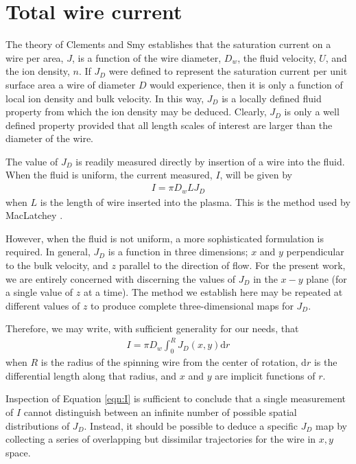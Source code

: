 \section{Total wire current}\label{sec:integral}

The theory of Clements and Smy establishes that the saturation current on a wire per area, $J$, is a function of the wire diameter, $D_w$, the fluid velocity, $U$, and the ion density, $n$.  If $J_D$ were defined to represent the saturation current per unit surface area a wire of diameter $D$ would experience, then it is only a function of local ion density and bulk velocity.  In this way, $J_D$ is a locally defined fluid property from which the ion density may be deduced.  Clearly, $J_D$ is only a well defined property provided that all length scales of interest are larger than the diameter of the wire.

The value of $J_D$ is readily measured directly by insertion of a wire into the fluid.  When the fluid is uniform, the current measured, $I$, will be given by
\begin{align}
I = \pi D_w L J_D\nonumber
\end{align}
when $L$ is the length of wire inserted into the plasma.  This is the method used by MacLatchey \cite{}.

However, when the fluid is not uniform, a more sophisticated formulation is required.  In general, $J_D$ is a function in three dimensions; $x$ and $y$ perpendicular to the bulk velocity, and $z$ parallel to the direction of flow.  For the present work, we are entirely concerned with discerning the values of $J_D$ in the $x-y$ plane (for a single value of $z$ at a time).  The method we establish here may be repeated at different values of $z$ to produce complete three-dimensional maps for $J_D$.

Therefore, we may write, with sufficient generality for our needs, that
\begin{align}
I = \pi D_w \int_0^R J_D(x,y) \mathrm{d} r\label{eqn:I}
\end{align}
when $R$ is the radius of the spinning wire from the center of rotation, $\mathrm{d}r$ is the differential length along that radius, and $x$ and $y$ are implicit functions of $r$.  

Inspection of Equation \ref{eqn:I} is sufficient to conclude that a single measurement of $I$ cannot distinguish between an infinite number of possible spatial distributions of $J_D$.  Instead, it should be possible to deduce a specific $J_D$ map by collecting a series of overlapping but dissimilar trajectories for the wire in $x,y$ space.

